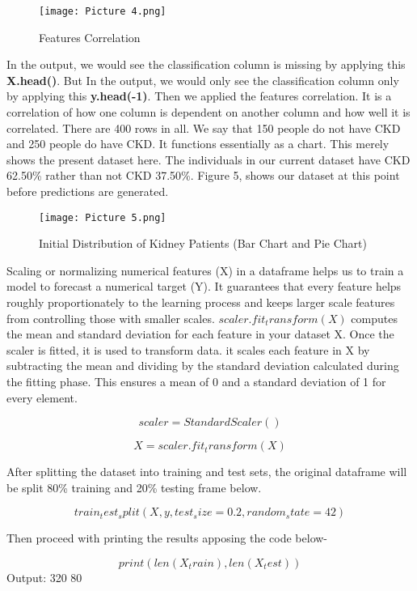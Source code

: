 \documentclass[conference]{IEEEtran}
\begin{document}
\begin{figure}[ht]
    \centering
    \texttt{[image: Picture 4.png]}
    \caption{Features Correlation} 
    \label{fig3}
\end{figure}


In the output, we would see the classification column is missing by applying this \textbf{X.head()}. But In the output, we would only see the classification column only by applying this \textbf{y.head(-1)}. Then we applied the features correlation. It is a correlation of how one column is dependent on another column and how well it is correlated. 
There are 400 rows in all. We say that 150 people do not have CKD and 250 people do have CKD. It functions essentially as a chart. This merely shows the present dataset here. The individuals in our current dataset have CKD 62.50\% rather than not CKD 37.50\%.  Figure 5, shows our dataset at this point before predictions are generated. 


\begin{figure}[htbp]
    \centering
    \texttt{[image: Picture 5.png]}
    \caption{Initial Distribution of Kidney Patients (Bar Chart and Pie Chart)} 
    \label{fig4}
\end{figure}

Scaling or normalizing numerical features (X) in a dataframe helps us to train a model to forecast a numerical target (Y). It guarantees that every feature helps roughly proportionately to the learning process and keeps larger scale features from controlling those with smaller scales. \(scaler.fit_transform(X)\) computes the mean and standard deviation for each feature in your dataset X. Once the scaler is fitted, it is used to transform data. it scales each feature in X by subtracting the mean and dividing by the standard deviation calculated during the fitting phase. 
This ensures a mean of 0 and a standard deviation of 1 for every element.


\[scaler = StandardScaler()\]


\[X = scaler.fit_transform(X)\]

After splitting the dataset into training and test sets, the original dataframe will be split 80\% training and 20\% testing frame below.

\[train_test_split(X, y, test_size=0.2, random_state=42)\]

Then proceed with printing the results apposing the code below-

\[print(len(X_train), len(X_test))\]
Output: 320 80
\end{document}
